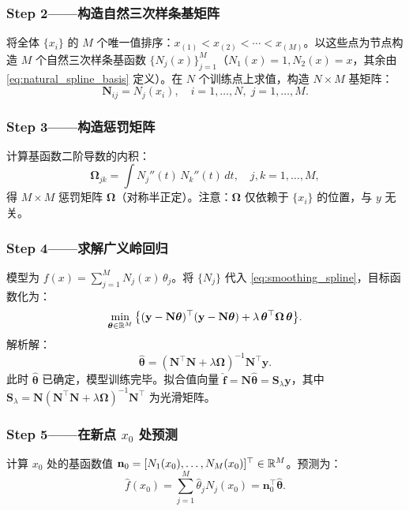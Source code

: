 \subsubsection{Step 2——构造自然三次样条基矩阵}

将全体 $\{x_i\}$ 的 $M$ 个唯一值排序：$x_{(1)} < x_{(2)} < \cdots < x_{(M)}$。以这些点为节点构造 $M$ 个自然三次样条基函数 $\{N_j(x)\}_{j=1}^{M}$（$N_1(x)=1, N_2(x)=x$，其余由 \eqref{eq:natural_spline_basis} 定义）。在 $N$ 个训练点上求值，构造 $N \times M$ 基矩阵：
\[
\mathbf{N}_{ij} = N_j(x_i),\quad i=1,\ldots,N,\; j=1,\ldots,M.
\]

\subsubsection{Step 3——构造惩罚矩阵}

计算基函数二阶导数的内积：
\[
\boldsymbol{\Omega}_{jk} = \int N_j''(t)\,N_k''(t)\,dt,\quad j,k=1,\ldots,M,
\]
得 $M \times M$ 惩罚矩阵 $\boldsymbol{\Omega}$（对称半正定）。注意：$\boldsymbol{\Omega}$ 仅依赖于 $\{x_i\}$ 的位置，与 $y$ 无关。

\subsubsection{Step 4——求解广义岭回归}

模型为 $f(x) = \sum_{j=1}^{M} N_j(x)\,\theta_j$。将 $\{N_j\}$ 代入 \eqref{eq:smoothing_spline}，目标函数化为：
\[
\min_{\boldsymbol{\theta} \in \mathbb{R}^{M}} \big\{ (\mathbf{y} - \mathbf{N}\boldsymbol{\theta})^\top(\mathbf{y} - \mathbf{N}\boldsymbol{\theta}) + \lambda\,\boldsymbol{\theta}^\top\boldsymbol{\Omega}\,\boldsymbol{\theta} \big\}.
\]
解析解：
\[
\hat{\boldsymbol{\theta}} = (\mathbf{N}^\top\mathbf{N} + \lambda\boldsymbol{\Omega})^{-1} \mathbf{N}^\top \mathbf{y}.
\]
此时 $\hat{\boldsymbol{\theta}}$ 已确定，模型训练完毕。拟合值向量 $\hat{\mathbf{f}} = \mathbf{N}\hat{\boldsymbol{\theta}} = \mathbf{S}_\lambda\mathbf{y}$，其中 $\mathbf{S}_\lambda = \mathbf{N}(\mathbf{N}^\top\mathbf{N} + \lambda\boldsymbol{\Omega})^{-1}\mathbf{N}^\top$ 为光滑矩阵。

\subsubsection{Step 5——在新点 $x_0$ 处预测}

计算 $x_0$ 处的基函数值 $\mathbf{n}_0 = [N_1(x_0),\ldots,N_M(x_0)]^\top \in \mathbb{R}^{M}$。预测为：
\[
\hat{f}(x_0) = \sum_{j=1}^{M} \hat{\theta}_j N_j(x_0) = \mathbf{n}_0^\top \hat{\boldsymbol{\theta}}.
\]

